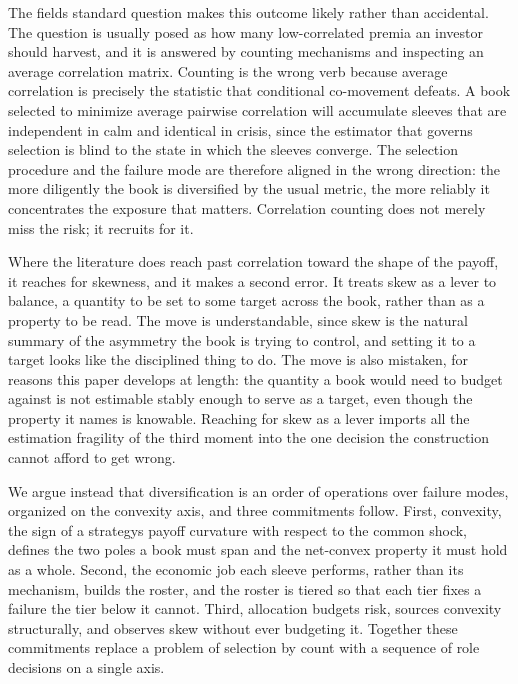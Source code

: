 \documentclass[12pt, a4paper]{article}
\begin{document}
The field\textquotesingle s standard question makes this outcome likely
rather than accidental. The question is usually posed as how many
low-correlated premia an investor should harvest, and it is answered by
counting mechanisms and inspecting an average correlation matrix.
Counting is the wrong verb because average correlation is precisely the
statistic that conditional co-movement defeats. A book selected to
minimize average pairwise correlation will accumulate sleeves that are
independent in calm and identical in crisis, since the estimator that
governs selection is blind to the state in which the sleeves converge.
The selection procedure and the failure mode are therefore aligned in
the wrong direction: the more diligently the book is diversified by the
usual metric, the more reliably it concentrates the exposure that
matters. Correlation counting does not merely miss the risk; it recruits
for it.

Where the literature does reach past correlation toward the shape of the
payoff, it reaches for skewness, and it makes a second error. It treats
skew as a lever to balance, a quantity to be set to some target across
the book, rather than as a property to be read. The move is
understandable, since skew is the natural summary of the asymmetry the
book is trying to control, and setting it to a target looks like the
disciplined thing to do. The move is also mistaken, for reasons this
paper develops at length: the quantity a book would need to budget
against is not estimable stably enough to serve as a target, even though
the property it names is knowable. Reaching for skew as a lever imports
all the estimation fragility of the third moment into the one decision
the construction cannot afford to get wrong.

We argue instead that diversification is an order of operations over
failure modes, organized on the convexity axis, and three commitments
follow. First, convexity, the sign of a strategy\textquotesingle s
payoff curvature with respect to the common shock, defines the two poles
a book must span and the net-convex property it must hold as a whole.
Second, the economic job each sleeve performs, rather than its
mechanism, builds the roster, and the roster is tiered so that each tier
fixes a failure the tier below it cannot. Third, allocation budgets
risk, sources convexity structurally, and observes skew without ever
budgeting it. Together these commitments replace a problem of selection
by count with a sequence of role decisions on a single axis.
\end{document}
